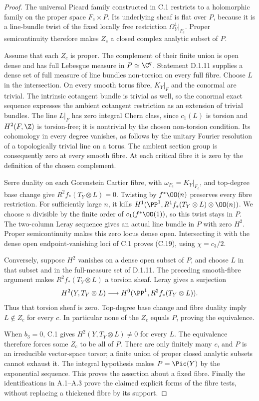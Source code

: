 \begin{proof}
The universal Picard family constructed in C.1 restricts to a holomorphic family on the proper space $F_c\times P$. Its underlying sheaf is flat over $P$, because it is a line-bundle twist of the fixed locally free restriction $\Omega_Y^1|_{F_c}$. Proper semicontinuity therefore makes $Z_c$ a closed complex analytic subset of $P$.

Assume that each $Z_c$ is proper. The complement of their finite union is open dense and has full Lebesgue measure in $P\simeq\C^q$. Statement D.1.11 supplies a dense set of full measure of line bundles non-torsion on every full fibre. Choose $L$ in the intersection. On every smooth torus fibre, $K_Y|_F$ and the conormal are trivial. The intrinsic cotangent bundle is trivial as well, so the conormal exact sequence expresses the ambient cotangent restriction as an extension of trivial bundles. The line $L|_F$ has zero integral Chern class, since $c_1(L)$ is torsion and $H^2(F,\Z)$ is torsion-free; it is nontrivial by the chosen non-torsion condition. Its cohomology in every degree vanishes, as follows by the unitary Fourier resolution of a topologically trivial line on a torus. The ambient section group is consequently zero at every smooth fibre. At each critical fibre it is zero by the definition of the chosen complement.

Serre duality on each Gorenstein Cartier fibre, with $\omega_{F_c}=K_Y|_{F_c}$, and top-degree base change give $R^2f_*(T_Y\otimes L)=0$. Twisting by $f^*\OO(n)$ preserves every fibre restriction. For sufficiently large $n$, it kills $H^1(\PP^1,R^1f_*(T_Y\otimes L)\otimes\OO(n))$. We choose $n$ divisible by the finite order of $c_1(f^*\OO(1))$, so this twist stays in $P$. The two-column Leray sequence gives an actual line bundle in $P$ with zero $H^2$. Proper semicontinuity makes this zero locus dense open. Intersecting it with the dense open endpoint-vanishing loci of C.1 proves (C.19), using $\chi=c_3/2$.

Conversely, suppose $H^2$ vanishes on a dense open subset of $P$, and choose $L$ in that subset and in the full-measure set of D.1.11. The preceding smooth-fibre argument makes $R^2f_*(T_Y\otimes L)$ a torsion sheaf. Leray gives a surjection
\[
 H^2(Y,T_Y\otimes L)\longrightarrow
 H^0(\PP^1,R^2f_*(T_Y\otimes L)).
\]
Thus that torsion sheaf is zero. Top-degree base change and fibre duality imply $L\notin Z_c$ for every $c$. In particular none of the $Z_c$ equals $P$, proving the equivalence.

When $b_3=0$, C.1 gives $H^2(Y,T_Y\otimes L)\ne0$ for every $L$. The equivalence therefore forces some $Z_c$ to be all of $P$. There are only finitely many $c$, and $P$ is an irreducible vector-space torsor; a finite union of proper closed analytic subsets cannot exhaust it. The integral hypothesis makes $P=\Pic(Y)$ by the exponential sequence. This proves the assertion about a fixed fibre. Finally the identifications in A.1--A.3 prove the claimed explicit forms of the fibre tests, without replacing a thickened fibre by its support.
\end{proof}

